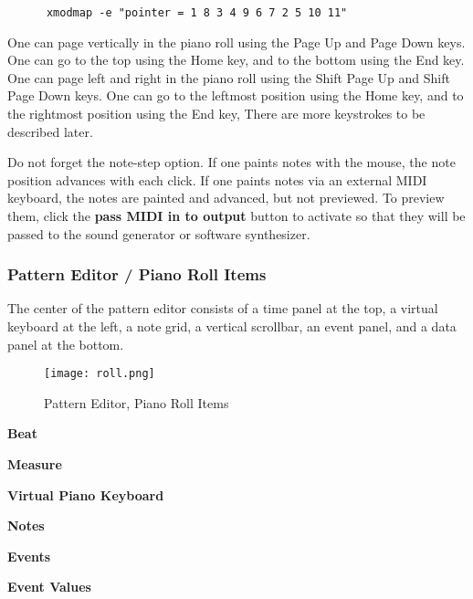    \begin{verbatim}
      xmodmap -e "pointer = 1 8 3 4 9 6 7 2 5 10 11"
   \end{verbatim}


   One can page vertically in the piano roll using the
    Page Up and 
    Page Down keys.
   One can go to the top using the 
    Home key, and
   to the bottom using the
    End key.
   One can page left and right in the piano roll using the
    Shift Page Up and 
    Shift Page Down keys.
   One can go to the leftmost position using the 
    Home key,
   and to the rightmost position using the
    End key,
   There are more keystrokes to be described later.

   Do not forget the note-step option.
   If one paints notes with the mouse,
   the note position advances with each click.
   If one paints notes via an external MIDI keyboard, the notes are painted and
   advanced, but not previewed.
   To preview them, click the
   \textbf{pass MIDI in to output} button to activate so that they will be
   passed to the sound generator or software synthesizer.

\subsubsection{Pattern Editor / Piano Roll Items}
\label{subsubsec:pattern_editor_piano_roll_items}

   The center of the pattern editor consists of a time panel at the top,
   a virtual keyboard at the left, a note grid, a vertical scrollbar, an event
   panel, and a data panel at the bottom.

\begin{figure}[H]
   \centering 
   \texttt{[image: roll.png]}
   \caption{Pattern Editor, Piano Roll Items}
   \label{fig:pattern_editor_piano_roll_items}
\end{figure}

   \begin{enumber}
      \item \textbf{Beat}
      \item \textbf{Measure}
      \item \textbf{Virtual Piano Keyboard}
      \item \textbf{Notes}
      \item \textbf{Events}
      \item \textbf{Event Values}
   \end{enumber}

